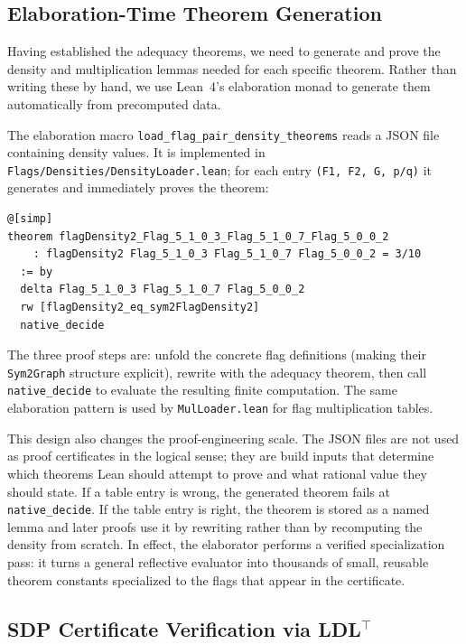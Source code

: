 \documentclass{article}
\newcommand{\lean}[1]{\texttt{#1}}
\begin{document}
\subsection{Elaboration-Time Theorem Generation}

Having established the adequacy theorems, we need to generate and prove the
density and multiplication lemmas needed for each specific theorem.  Rather
than writing these by hand, we use Lean~4's elaboration monad to generate them
automatically from precomputed data.

The elaboration macro \lean{load\_flag\_pair\_density\_theorems} reads a JSON
file containing density values.  It is implemented in
\lean{Flags/Densities/DensityLoader.lean}; for each entry
\lean{(F1, F2, G, p/q)} it generates and immediately proves the theorem:
\begin{lstlisting}
@[simp]
theorem flagDensity2_Flag_5_1_0_3_Flag_5_1_0_7_Flag_5_0_0_2
    : flagDensity2 Flag_5_1_0_3 Flag_5_1_0_7 Flag_5_0_0_2 = 3/10
  := by
  delta Flag_5_1_0_3 Flag_5_1_0_7 Flag_5_0_0_2
  rw [flagDensity2_eq_sym2FlagDensity2]
  native_decide
\end{lstlisting}
The three proof steps are: unfold the concrete flag definitions (making their
\lean{Sym2Graph} structure explicit), rewrite with the adequacy theorem, then
call \lean{native\_decide} to evaluate the resulting finite computation.
The same elaboration pattern is used by \lean{MulLoader.lean} for flag
multiplication tables.

This design also changes the proof-engineering scale.  The JSON files are not
used as proof certificates in the logical sense; they are build inputs that
determine which theorems Lean should attempt to prove and what rational value
they should state.  If a table entry is wrong, the generated theorem fails at
\lean{native\_decide}.  If the table entry is right, the theorem is stored as a
named lemma and later proofs use it by rewriting rather than by recomputing the
density from scratch.  In effect, the elaborator performs a verified
specialization pass: it turns a general reflective evaluator into thousands of
small, reusable theorem constants specialized to the flags that appear in the
certificate.

\subsection{SDP Certificate Verification via \texorpdfstring{LDL$^\top$}{LDL\string^T}}
\label{sec:sdp}
\end{document}
